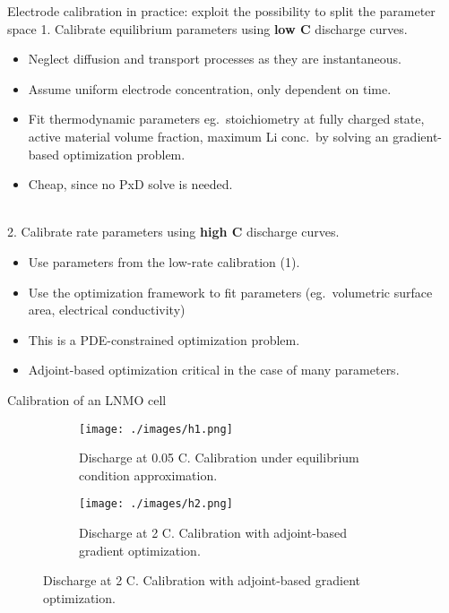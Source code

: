 \documentclass{beamer}
\begin{document}
\begin{frame}{Electrode calibration in practice: exploit the possibility to split the parameter space}
\footnotesize
  1. Calibrate equilibrium parameters using {\bf low C} discharge curves.

  \begin{itemize}
  \item Neglect diffusion and transport processes as they are instantaneous.
  \item Assume uniform electrode concentration, only dependent on time.
  \item Fit thermodynamic parameters eg.\ stoichiometry at fully charged state, active material volume fraction, maximum Li conc.\ by solving an gradient-based optimization problem.
  \item Cheap, since no PxD solve is needed.
  \end{itemize}

\ \\

  2. Calibrate rate parameters using {\bf high C} discharge curves.

  \begin{itemize}
  \item Use parameters from the low-rate calibration (1).
  \item Use the optimization framework to fit parameters (eg.\ volumetric surface area, electrical conductivity) %
  \item This is a PDE-constrained optimization problem.
  \item Adjoint-based optimization critical in the case of many parameters.
  \end{itemize}

\end{frame}

\begin{frame}{Calibration of an LNMO cell}


  \begin{figure}
    \centering
    \captionsetup[subfigure]{justification=centering}
    \begin{subfigure}[]{0.45\linewidth}
      \centering
      \texttt{[image: ./images/h1.png]}
      \caption{Discharge at 0.05 C. Calibration under equilibrium condition approximation.}
    \end{subfigure}
    \begin{subfigure}[]{0.45\linewidth}
      \centering
      \texttt{[image: ./images/h2.png]}
      \caption{Discharge at 2 C. Calibration with adjoint-based gradient optimization. }
    \end{subfigure}
  \end{figure}

\end{frame}
\end{document}
